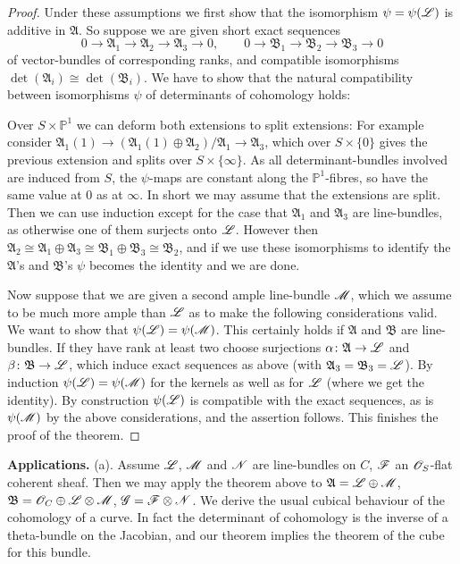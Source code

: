 \documentclass[12pt,english]{smfart}
\newcommand{\Ab}{\mathfrak{A}} \newcommand{\Bb}{\mathfrak{B}} \newcommand{\FA}{\mathfrak{A}} \newcommand{\FB}{\mathfrak{B}} \newcommand{\g}{\mathfrak{g}} \newcommand{\n}{\mathfrak{n}} \newcommand{\h}{\mathfrak{h}} \newcommand{\hh}{\mathfrak{h}} \newcommand{\p}{\mathfrak{p}} \newcommand{\ttt}{\mathfrak{t}} \newcommand{\zz}{\mathfrak{z}} \newcommand{\slt}{\mathfrak{sl}_2} \newcommand{\sltwo}{\mathfrak{sl}_2}
\theoremstyle{plain} \newtheorem{innerthm}{Theorem} \newtheorem{innerlem}{Lemma} \newtheorem{innerprop}{Proposition} \newtheorem{innercor}{Corollary} \theoremstyle{definition} \newtheorem{innerdefn}{Definition} \newtheorem{innerconstr}{Construction} \theoremstyle{remark} \newtheorem*{remark}{Remark} \newtheorem*{remarks}{Remarks} \newtheorem*{applications}{Applications}
\begin{document}
\begin{proof}
Under these assumptions we first show that the isomorphism $\psi=\psi(\mathscr{L})$ is additive in $\Ab$. So suppose we are given short exact sequences
\[
0\to\Ab_1\to\Ab_2\to\Ab_3\to 0,\qquad
0\to\Bb_1\to\Bb_2\to\Bb_3\to 0
\]
of vector-bundles of corresponding ranks, and compatible isomorphisms $\det(\Ab_i)\cong\det(\Bb_i)$. We have to show that the natural compatibility between isomorphisms $\psi$ of determinants of cohomology holds:

Over $S\times\mathbb{P}^1$ we can deform both extensions to split extensions: For example consider $\Ab_1(1)\to(\Ab_1(1)\oplus\Ab_2)/\Ab_1\to\Ab_3$, which over $S\times\{0\}$ gives the previous extension and splits over $S\times\{\infty\}$. As all determinant-bundles involved are induced from $S$, the $\psi$-maps are constant along the $\mathbb{P}^1$-fibres, so have the same value at $0$ as at $\infty$. In short we may assume that the extensions are split. Then we can use induction except for the case that $\Ab_1$ and $\Ab_3$ are line-bundles, as otherwise one of them surjects onto $\mathscr{L}$. However then $\Ab_2\cong\Ab_1\oplus\Ab_3\cong\Bb_1\oplus\Bb_3\cong\Bb_2$, and if we use these isomorphisms to identify the $\Ab$'s and $\Bb$'s $\psi$ becomes the identity and we are done.

Now suppose that we are given a second ample line-bundle $\mathscr{M}$, which we assume to be much more ample than $\mathscr{L}$ as to make the following considerations valid. We want to show that $\psi(\mathscr{L})=\psi(\mathscr{M})$. This certainly holds if $\Ab$ and $\Bb$ are line-bundles. If they have rank at least two choose surjections $\alpha\colon\Ab\to\sL$ and $\beta\colon\Bb\to\sL$, which induce exact sequences as above (with $\Ab_3=\Bb_3=\sL$). By induction $\psi(\mathscr{L})=\psi(\mathscr{M})$ for the kernels as well as for $\mathscr{L}$ (where we get the identity). By construction $\psi(\mathscr{L})$ is compatible with the exact sequences, as is $\psi(\mathscr{M})$ by the above considerations, and the assertion follows. This finishes the proof of the theorem.
\end{proof}

\medskip
\noindent\textbf{Applications.} (a). Assume $\mathscr{L}$, $\mathscr{M}$ and $\mathscr{N}$ are
line-bundles on $C$, $\mathscr{F}$ an $\mathscr{O}_S$-flat coherent sheaf. Then we may apply the theorem above to $\Ab=\sL\oplus\sM$, $\Bb=\sO_C\oplus\sL\otimes\sM$, $\mathscr{G}=\mathscr{F}\otimes\mathscr{N}$. We derive the usual cubical behaviour of the cohomology of a curve. In fact the determinant of cohomology is the inverse of a theta-bundle on the Jacobian, and our theorem implies the theorem of the cube for this bundle.
\end{document}
